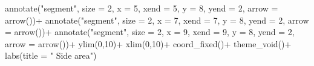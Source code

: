 \documentclass[
  letterpaper,
  DIV=11,
  numbers=noendperiod]{scrreprt}
\newenvironment{Shaded}{\begin{snugshade}}{\end{snugshade}}
\newcommand{\AttributeTok}[1]{\textcolor[rgb]{0.40,0.45,0.13}{#1}}
\newcommand{\DecValTok}[1]{\textcolor[rgb]{0.68,0.00,0.00}{#1}}
\newcommand{\FunctionTok}[1]{\textcolor[rgb]{0.28,0.35,0.67}{#1}}
\newcommand{\NormalTok}[1]{\textcolor[rgb]{0.00,0.23,0.31}{#1}}
\newcommand{\SpecialCharTok}[1]{\textcolor[rgb]{0.37,0.37,0.37}{#1}}
\newcommand{\StringTok}[1]{\textcolor[rgb]{0.13,0.47,0.30}{#1}}
\begin{document}
\begin{Shaded}
\begin{Highlighting}[]
  \FunctionTok{annotate}\NormalTok{(}\StringTok{"segment"}\NormalTok{, }\AttributeTok{size =} \DecValTok{2}\NormalTok{, }\AttributeTok{x =} \DecValTok{5}\NormalTok{, }\AttributeTok{xend =} \DecValTok{5}\NormalTok{, }\AttributeTok{y =} \DecValTok{8}\NormalTok{, }\AttributeTok{yend =} \DecValTok{2}\NormalTok{, }\AttributeTok{arrow =} \FunctionTok{arrow}\NormalTok{())}\SpecialCharTok{+}
  \FunctionTok{annotate}\NormalTok{(}\StringTok{"segment"}\NormalTok{, }\AttributeTok{size =} \DecValTok{2}\NormalTok{, }\AttributeTok{x =} \DecValTok{7}\NormalTok{, }\AttributeTok{xend =} \DecValTok{7}\NormalTok{, }\AttributeTok{y =} \DecValTok{8}\NormalTok{, }\AttributeTok{yend =} \DecValTok{2}\NormalTok{, }\AttributeTok{arrow =} \FunctionTok{arrow}\NormalTok{())}\SpecialCharTok{+}
  \FunctionTok{annotate}\NormalTok{(}\StringTok{"segment"}\NormalTok{, }\AttributeTok{size =} \DecValTok{2}\NormalTok{, }\AttributeTok{x =} \DecValTok{9}\NormalTok{, }\AttributeTok{xend =} \DecValTok{9}\NormalTok{, }\AttributeTok{y =} \DecValTok{8}\NormalTok{, }\AttributeTok{yend =} \DecValTok{2}\NormalTok{, }\AttributeTok{arrow =} \FunctionTok{arrow}\NormalTok{())}\SpecialCharTok{+}
  \FunctionTok{ylim}\NormalTok{(}\DecValTok{0}\NormalTok{,}\DecValTok{10}\NormalTok{)}\SpecialCharTok{+}
  \FunctionTok{xlim}\NormalTok{(}\DecValTok{0}\NormalTok{,}\DecValTok{10}\NormalTok{)}\SpecialCharTok{+}
  \FunctionTok{coord\_fixed}\NormalTok{()}\SpecialCharTok{+}
  \FunctionTok{theme\_void}\NormalTok{()}\SpecialCharTok{+}
  \FunctionTok{labs}\NormalTok{(}\AttributeTok{title =} \StringTok{"      Side area"}\NormalTok{)}


\end{Highlighting}
\end{Shaded}
\end{document}

